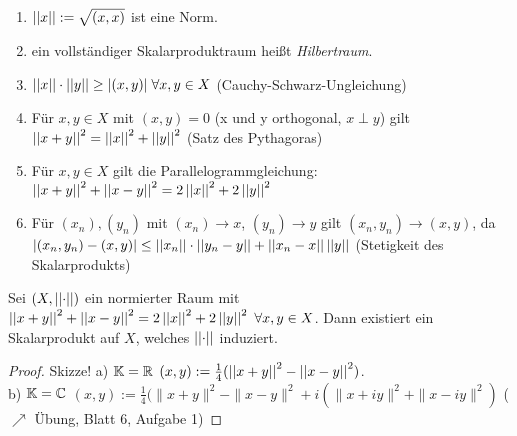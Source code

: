 \documentclass[ngerman]{report}
\begin{document}
	\begin{bem}
		\begin{enumerate}[1)]
			\item $\norm{x} := \sqrt{(x,x)}$ ist eine Norm.
			\item ein vollständiger Skalarproduktraum heißt \textit{Hilbertraum}.
			\item $\norm{x} \cdot \norm{y} \geq |(x,y)| \; \forall x,y \in X$ (Cauchy-Schwarz-Ungleichung)

			\item Für $x,y \in X$ mit $(x,y) = 0$ (x und y orthogonal, $x \perp y$)
			gilt $\norm{x + y}^2 = \norm{x}^2 + \norm{y}^2$ (Satz des Pythagoras)
			\item Für $x,y \in X$ gilt die Parallelogrammgleichung: 
				$\norm{x + y} ^2 + \norm{x - y}^2 = 2 \norm{x}^2 + 2\norm{y}^2$
			\item	Für $(x_n), (y_n)$ mit $(x_n) \to x$, $(y_n) \to y$ gilt 
				$(x_n, y_n) \to (x,y)$, da\\ 
				$|(x_n, y_n) - (x,y)| \leq \norm{x_n}\cdot \norm{y_n - y} + \norm{x_n - x}\norm{y}$ (Stetigkeit des Skalarprodukts)
		\end{enumerate}
	\end{bem}
	\begin{thm}
	Sei $(X,\norm{\cdot})$ ein normierter Raum mit $\norm{x+y}^2 + \norm{x-y}^2 = 2\norm{x}^2 +2\norm{y}^2 ~\forall x,y \in X$. Dann existiert ein Skalarprodukt auf $X$, welches $\norm{\cdot}$ induziert.
	\end{thm}
	\begin{proof}
		Skizze! a) $\K = \R$ $(x,y) := \frac{1}{4}(\norm{x + y}^2 - \norm{x-y}^2)$.\\ b) $\K = \C$ $(x,y) := \frac{1}{4}(\| x+y\|^2 - \|x-y\|^2 + i(\|x+iy\|^2 + \|x-iy\|^2)$ ($\nearrow$ Übung, Blatt 6, Aufgabe 1)
	\end{proof}
\end{document}
